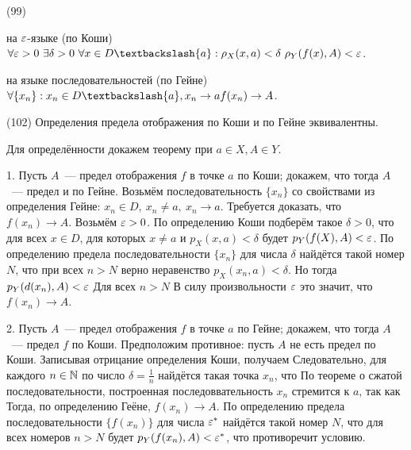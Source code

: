 (99)

\Op на $\varepsilon$-языке (по Коши)\\
$\forall \eps > 0\ \exists \delta > 0\ \forall x \in D \bsl \{a\}: \rho_X(x, a) < \delta\ \rho_Y(f(x), A) < \eps$.

\Op на языке последовательностей (по Гейне)\\
$\forall \{x_n\}: x_n\in D\bsl\{a\}, x_n \to a f(x_n) \to A$.

(102)
\T Определения предела отображения по Коши и по Гейне эквивалентны.

\D Для определённости докажем теорему при $a \in X, A \in Y$.

1. Пусть $A$~--- предел отображения $f$ в точке $a$ по Коши; докажем, что тогда $A$~--- предел и по Гейне. Возьмём последовательность $\{x_n\}$ со свойствами из определения Гейне: $x_n \in D,\ x_n \neq a,\ x_n\to a$. Требуется доказать, что $f(x_n) \to A$. Возьмём $\varepsilon > 0$. По определению Коши подберём такое $\delta> 0$, что для всех $x\in D$, для которых $x\neq a$ и $p_X(x, a) <\delta$  будет $p_Y(f(X), A) < \varepsilon$. По определению предела последовательности $\{x_n\}$ для числа $\delta$ найдётся такой  номер $N$, что при всех $n > N$ верно неравенство $p_X(x_n, a) < \delta$. Но тогда $p_Y(d(x_n), A) < \varepsilon$ Для всех $n > N$ В силу произвольности $\varepsilon$ это значит, что $f(x_n) \to A$.

2. Пусть $A$~--- предел отображения $f$ в точке $a$ по Гейне; докажем, что тогда $A$~--- предел $f$ по Коши. Предположим противное: пусть $A$ не есть предел по Коши. Записывая отрицание определения Коши, получаем
 Следовательно, для каждого $n \in \mathbb{N}$ по число $\delta = \frac 1n$ найдётся такая точка $x_n$, что  По теореме о сжатой последовательности, построенная последоввательность $x_n$ стремится к $a$, так как  Тогда, по определению Геёне, $f(x_n) \to A$. По определению предела последовательности $\{f(x_n)\}$ для числа $\varepsilon^*$ найдётся такой номер $N$, что для всех номеров $n > N$ будет $p_Y(f(x_n), A) < \varepsilon^*$, что противоречит условию.